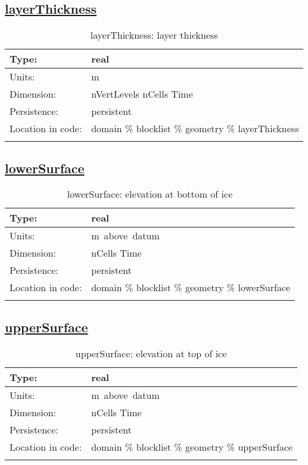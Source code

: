\subsection[layerThickness]{\hyperref[sec:var_tab_geometry]{layerThickness}}
\label{subsec:var_sec_geometry_layerThickness}
\begin{center}
\begin{longtable}{| p{2.0in} | p{4.0in} |}
        \hline 
        Type: & real \\
        \hline 
        Units: & \si{m} \\
        \hline 
        Dimension: & nVertLevels nCells Time \\
        \hline 
        Persistence: & persistent \\
        \hline 
         Location in code: & domain \% blocklist \% geometry \% layerThickness \\
         \hline 
    \caption{layerThickness: layer thickness}
\end{longtable}
\end{center}
\subsection[lowerSurface]{\hyperref[sec:var_tab_geometry]{lowerSurface}}
\label{subsec:var_sec_geometry_lowerSurface}
\begin{center}
\begin{longtable}{| p{2.0in} | p{4.0in} |}
        \hline 
        Type: & real \\
        \hline 
        Units: & \si{m.above.datum} \\
        \hline 
        Dimension: & nCells Time \\
        \hline 
        Persistence: & persistent \\
        \hline 
         Location in code: & domain \% blocklist \% geometry \% lowerSurface \\
         \hline 
    \caption{lowerSurface: elevation at bottom of ice}
\end{longtable}
\end{center}
\subsection[upperSurface]{\hyperref[sec:var_tab_geometry]{upperSurface}}
\label{subsec:var_sec_geometry_upperSurface}
\begin{center}
\begin{longtable}{| p{2.0in} | p{4.0in} |}
        \hline 
        Type: & real \\
        \hline 
        Units: & \si{m.above.datum} \\
        \hline 
        Dimension: & nCells Time \\
        \hline 
        Persistence: & persistent \\
        \hline 
         Location in code: & domain \% blocklist \% geometry \% upperSurface \\
         \hline 
    \caption{upperSurface: elevation at top of ice}
\end{longtable}
\end{center}
